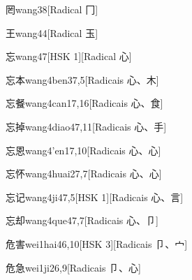 \begin{entry}{罔}{wang3}{8}[Radical ⼌]
\end{entry}

\begin{entry}{王}{wang4}{4}[Radical ⽟]
\end{entry}

\begin{entry}{忘}{wang4}{7}[HSK 1][Radical ⼼]
\end{entry}

\begin{entry}{忘本}{wang4ben3}{7,5}[Radicais ⼼、⽊]
\end{entry}

\begin{entry}{忘餐}{wang4can1}{7,16}[Radicais ⼼、⾷]
\end{entry}

\begin{entry}{忘掉}{wang4diao4}{7,11}[Radicais ⼼、⼿]
\end{entry}

\begin{entry}{忘恩}{wang4'en1}{7,10}[Radicais ⼼、⼼]
\end{entry}

\begin{entry}{忘怀}{wang4huai2}{7,7}[Radicais ⼼、⼼]
\end{entry}

\begin{entry}{忘记}{wang4ji4}{7,5}[HSK 1][Radicais ⼼、⾔]
\end{entry}

\begin{entry}{忘却}{wang4que4}{7,7}[Radicais ⼼、⼙]
\end{entry}

\begin{entry}{危害}{wei1hai4}{6,10}[HSK 3][Radicais ⼙、⼧]
\end{entry}

\begin{entry}{危急}{wei1ji2}{6,9}[Radicais ⼙、⼼]
\end{entry}

